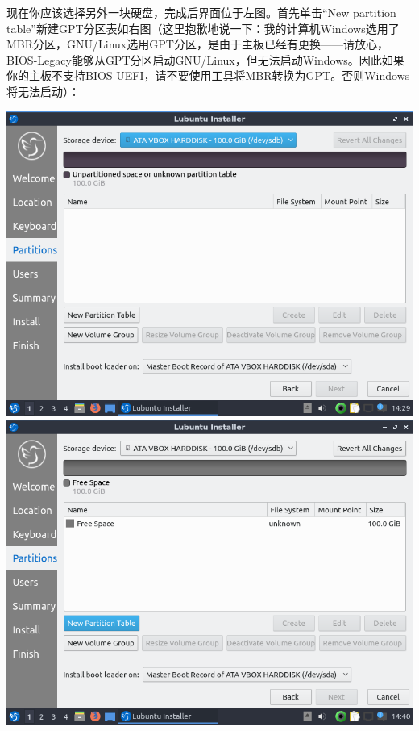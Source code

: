 \documentclass{book}
\begin{document}
现在你应该选择另外一块硬盘，完成后界面位于左图。首先单击“New partition table”新建GPT分区表如右图（这里抱歉地说一下：我的计算机Windows选用了MBR分区，GNU/Linux选用GPT分区，是由于主板已经有更换——请放心，BIOS-Legacy能够从GPT分区启动GNU/Linux，但无法启动Windows。因此如果你的主板不支持BIOS-UEFI，请不要使用工具将MBR转换为GPT。否则Windows将无法启动）：
\begin{center}
	\includegraphics[scale=0.4]{pic/lubinst8}	\includegraphics[scale=0.4]{pic/lubinst9}\\

\end{center}
\end{document}
